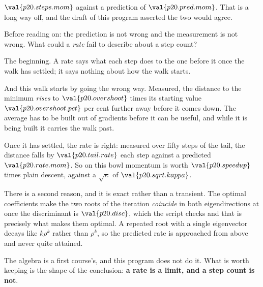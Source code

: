 \begin{fr}
$\val{p20.steps.mom}$ against a prediction of $\val{p20.pred.mom}$. That is a
long way off, and the draft of this program asserted the two would agree.

Before reading on: the prediction is not wrong and the measurement is not
wrong. What could a \emph{rate} fail to describe about a step count?
\dotline
\nextframe
\end{fr}

\begin{fr}
\begin{ansblock}
The beginning. A rate says what each step does to the one before it once the
walk has settled; it says nothing about how the walk starts.
\end{ansblock}

And this walk starts by going the wrong way. Measured, the distance to the
minimum \emph{rises} to $\val{p20.overshoot}$ times its starting value \dash{}
$\val{p20.overshoot.pct}$ per cent further away \dash{} before it comes down.
The average has to be built out of gradients before it can be useful, and while
it is being built it carries the walk past.

Once it has settled, the rate is right: measured over fifty steps of the tail,
the distance falls by $\val{p20.tail.rate}$ each step against a predicted
$\val{p20.rate.mom}$. So on this bowl momentum is worth
$\val{p20.speedup}$ times plain descent, against a $\sqrt{\kappa}$ of
$\val{p20.sqrt.kappa}$.
\end{fr}

\begin{fr}
\begin{rigourbox}
There is a second reason, and it is exact rather than a transient. The
optimal coefficients make the two roots of the iteration \emph{coincide} in
both eigendirections at once \dash{} the discriminant is
$\val{p20.disc}$, which the script checks \dash{} and that is precisely what
makes them optimal. A repeated root with a single eigenvector decays like
$k\rho^{k}$ rather than $\rho^{k}$, so the predicted rate is approached from
above and never quite attained.

The algebra is a first course's, and this program does not do it. What is
worth keeping is the shape of the conclusion: \textbf{a rate is a limit, and
a step count is not}.
\end{rigourbox}
\end{fr}


